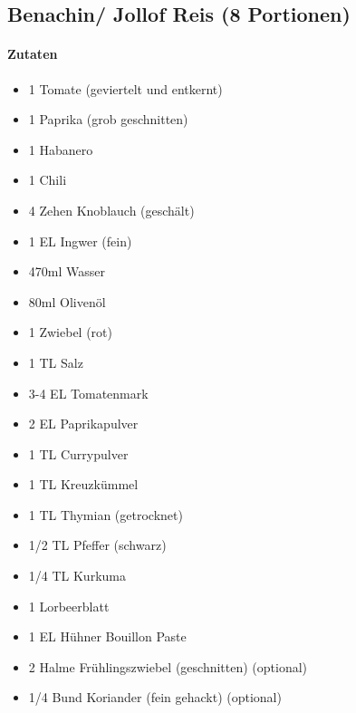 \newpage
\subsection{Benachin/ Jollof Reis (8 Portionen)}
\paragraph{Zutaten}
\begin{itemize}[noitemsep]
	\item 1 Tomate (geviertelt und entkernt)
	\item 1 Paprika (grob geschnitten)
	\item 1 Habanero 
	\item 1 Chili
	\item 4 Zehen Knoblauch (geschält)
	\item 1 EL Ingwer (fein)
	\item 470ml Wasser
	\vspace{0.5cm}
	\item 80ml Olivenöl
	\item 1 Zwiebel (rot)
	\item 1 TL Salz
	\item 3-4 EL Tomatenmark 
	\item 2 EL Paprikapulver
	\item 1 TL Currypulver
	\item 1 TL Kreuzkümmel
	\item 1 TL Thymian (getrocknet)
	\item 1/2 TL Pfeffer (schwarz)
	\item 1/4 TL Kurkuma
	\item 1 Lorbeerblatt
	\item 1 EL Hühner Bouillon Paste
	\item 2 Halme Frühlingszwiebel (geschnitten) (optional)
	\item 1/4 Bund Koriander (fein gehackt) (optional)
\end{itemize}
